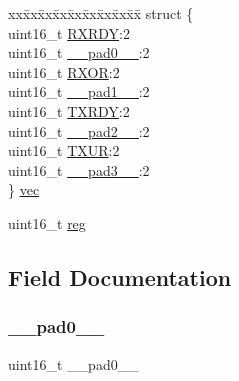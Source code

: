 \begin{DoxyCompactItemize}
\begin{tabbing}
\end{tabbing}\item 
\begin{tabbing}
xx\=xx\=xx\=xx\=xx\=xx\=xx\=xx\=xx\=\kill
struct \{\\
\>uint16\_t \mbox{\hyperlink{union_i2_s___i_n_t_e_n_c_l_r___type_afbe93691d575a8711eb9b4cc45469a9c}{RXRDY}}:2\\
\>uint16\_t \mbox{\hyperlink{union_i2_s___i_n_t_e_n_c_l_r___type_a77132c2c26a75f5b8751b235cda23828}{\_\_pad0\_\_}}:2\\
\>uint16\_t \mbox{\hyperlink{union_i2_s___i_n_t_e_n_c_l_r___type_a285bb39da21bfa8a0a512e3922282028}{RXOR}}:2\\
\>uint16\_t \mbox{\hyperlink{union_i2_s___i_n_t_e_n_c_l_r___type_ab72e3a1f2f7db8695c60c658f5a0f11a}{\_\_pad1\_\_}}:2\\
\>uint16\_t \mbox{\hyperlink{union_i2_s___i_n_t_e_n_c_l_r___type_a322dfa8965b7f91311c1c41ed95c05fe}{TXRDY}}:2\\
\>uint16\_t \mbox{\hyperlink{union_i2_s___i_n_t_e_n_c_l_r___type_a82701c5ec65a0fca9a84d8edc46a8192}{\_\_pad2\_\_}}:2\\
\>uint16\_t \mbox{\hyperlink{union_i2_s___i_n_t_e_n_c_l_r___type_abfdd566f2c79878c3cc044d5780c26c8}{TXUR}}:2\\
\>uint16\_t \mbox{\hyperlink{union_i2_s___i_n_t_e_n_c_l_r___type_a1b0a1a9de051f3174325808d959500f7}{\_\_pad3\_\_}}:2\\
\} \mbox{\hyperlink{union_i2_s___i_n_t_e_n_c_l_r___type_aafa1c2f11d4bb9852c9af0428a87c5c1}{vec}}\\

\end{tabbing}\item 
uint16\+\_\+t \mbox{\hyperlink{union_i2_s___i_n_t_e_n_c_l_r___type_a11760f5020019f4aa8cb02e694f7cc44}{reg}}
\end{DoxyCompactItemize}


\subsection{Field Documentation}
\mbox{\label{union_i2_s___i_n_t_e_n_c_l_r___type_a77132c2c26a75f5b8751b235cda23828}} 
\subsubsection{\texorpdfstring{\_\_pad0\_\_}{\_\_pad0\_\_}}
{\footnotesize\ttfamily uint16\+\_\+t \+\_\+\+\_\+pad0\+\_\+\+\_\+}

